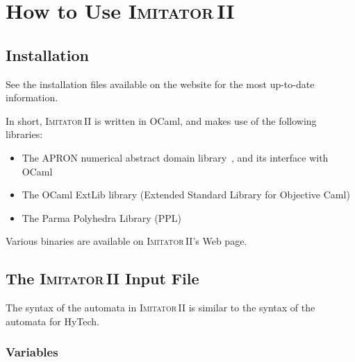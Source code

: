 \documentclass[a4paper,10pt]{article}
\newcommand{\hytech}{{\sc HyTech}}
\newcommand{\imitatordeux}{\textsc{Imitator}\,II}
\newcommand{\ocaml}{OCaml}
\begin{document}
\section{How to Use \imitatordeux{}} \label{sec:how}

\subsection{Installation}

See the installation files available on the website for the most up-to-date information.

In short, \imitatordeux{} is written in \ocaml{}, and makes use of the following libraries:

\begin{itemize}
	\item The APRON numerical abstract domain library~\cite{jm09}, and its interface with \ocaml{}
	\item The OCaml ExtLib library (Extended Standard Library for Objective Caml)
	\item The Parma Polyhedra Library (PPL)~\cite{bhz08}
\end{itemize}

Various binaries are available on \imitatordeux{}'s Web page.



\subsection{The \imitatordeux{} Input File}

The syntax of the automata in \imitatordeux{} is similar to the syntax of the automata for \hytech{}.


\subsubsection{Variables}
\end{document}
